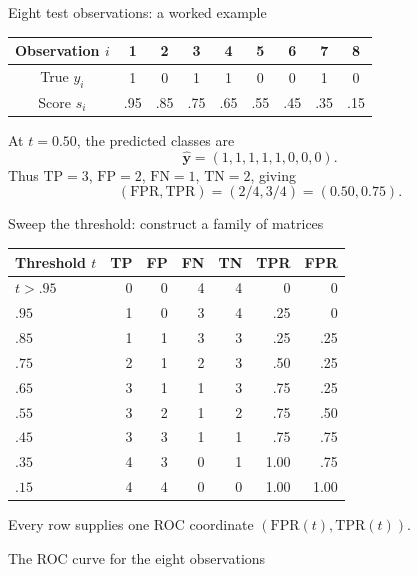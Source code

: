 \documentclass[aspectratio=169,11pt]{beamer}
\begin{document}
\begin{frame}{Eight test observations: a worked example}
\centering
\begin{tabular}{c*{8}{c}}
\toprule
Observation $i$ &1&2&3&4&5&6&7&8\\\midrule
True $y_i$ &1&0&1&1&0&0&1&0\\
Score $s_i$ &.95&.85&.75&.65&.55&.45&.35&.15\\\bottomrule
\end{tabular}
\vspace{1em}
At $t=0.50$, the predicted classes are
\[\widehat{\mathbf y}=(1,1,1,1,1,0,0,0).\]
Thus $\mathrm{TP}=3$, $\mathrm{FP}=2$, $\mathrm{FN}=1$, $\mathrm{TN}=2$, giving
\[\boxed{(\mathrm{FPR},\mathrm{TPR})=(2/4,3/4)=(0.50,0.75).}\]
\end{frame}
\begin{frame}{Sweep the threshold: construct a family of matrices}
\centering\small
\begin{tabular}{lrrrrrr}
\toprule
Threshold $t$ & TP & FP & FN & TN & TPR & FPR\\\midrule
$t>.95$ &0&0&4&4&0&0\\
$.95$ &1&0&3&4&.25&0\\
$.85$ &1&1&3&3&.25&.25\\
$.75$ &2&1&2&3&.50&.25\\
$.65$ &3&1&1&3&.75&.25\\
$.55$ &3&2&1&2&.75&.50\\
$.45$ &3&3&1&1&.75&.75\\
$.35$ &4&3&0&1&1.00&.75\\
$.15$ &4&4&0&0&1.00&1.00\\\bottomrule
\end{tabular}
\vspace{.5em}
\small Every row supplies one ROC coordinate $(\mathrm{FPR}(t),\mathrm{TPR}(t))$.
\end{frame}
\begin{frame}{The ROC curve for the eight observations}
\centering
{}
\end{frame}
\end{document}
